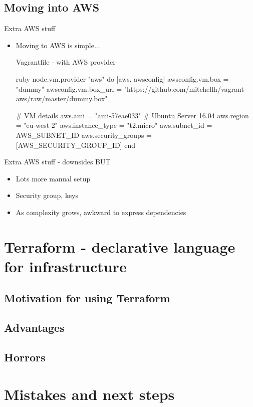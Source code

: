 \documentclass[xcolor=dvipsnames]{beamer}
\begin{document}
\subsection[Cloudy time]{Moving into AWS}
\begin{frame}[fragile]{Extra AWS stuff}
  \begin{itemize}
    \item Moving to AWS is simple...
    \begin{block}{Vagrantfile - with AWS provider}
      \begin{code}{ruby}
node.vm.provider "aws" do |aws, awsconfig|
  awsconfig.vm.box     = "dummy"
  awsconfig.vm.box_url = "https://github.com/mitchellh/vagrant-aws/raw/master/dummy.box"

  # VM details
  aws.ami                = "ami-57eae033" # Ubuntu Server 16.04
  aws.region             = "eu-west-2"
  aws.instance_type      = "t2.micro"
  aws.subnet_id          = AWS_SUBNET_ID
  aws.security_groups    = [AWS_SECURITY_GROUP_ID]
end
      \end{code}
    \end{block}
  \end{itemize}
\end{frame}

\begin{frame}{Extra AWS stuff - downsides}
BUT
  \begin{itemize}
    \item Lots more manual setup
    \item Security group, keys
    \item As complexity grows, awkward to express dependencies
  \end{itemize}
\end{frame}

\section[Terraform]{Terraform - declarative language for infrastructure}

\subsection[Motivation]{Motivation for using Terraform}

\subsection{Advantages}

\subsection{Horrors}



\section[Next steps]{Mistakes and next steps}
\end{document}
